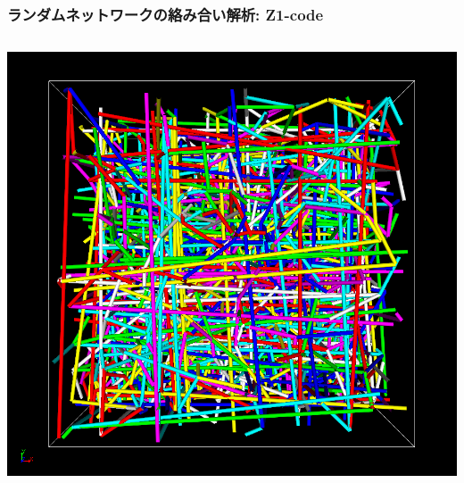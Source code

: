 \documentclass[aspectratio=169,11pt, dvipdfmx]{beamer}
\begin{document}
\begin{frame}
    \frametitle{ランダムネットワークの絡み合い解析: Z1-code}
        \vspace{-1mm}
        \begin{columns}[onlytextwidth]
            \centering
                \includegraphics[width=.7\textwidth]{z_cord_4Chain.png}


\end{columns}
\end{frame}
\end{document}
